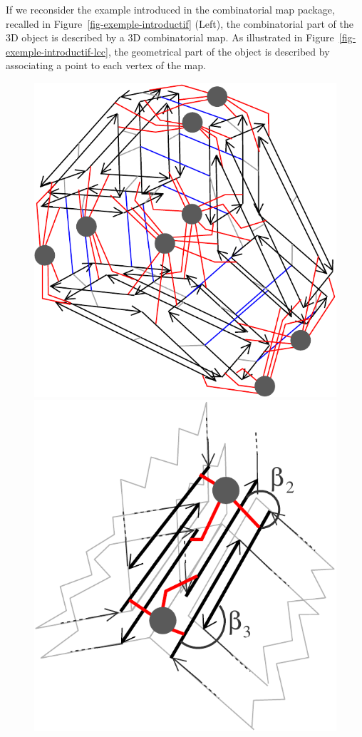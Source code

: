 If we reconsider the example introduced in the combinatorial map
package, recalled in Figure~\ref{fig-exemple-introductif} (Left), the
combinatorial part of the 3D object is described by a 3D combinatorial
map. As illustrated in Figure~\ref{fig-exemple-introductif-lcc}, the
geometrical part of the object is described by associating a point to
each vertex of the map.
%
\def\LargFig{.3\textwidth}
\begin{figure}[h]
  \begin{ccTexOnly}
    \begin{center}
      \includegraphics[width=\LargFig]{Linear_cell_complex/fig/pdf/intuitif-example-lcc}\qquad
      \includegraphics[width=\LargFig]{Linear_cell_complex/fig/pdf/intuitif-example-lcc-zoom}

\end{center}
\end{ccTexOnly}
\end{figure}
